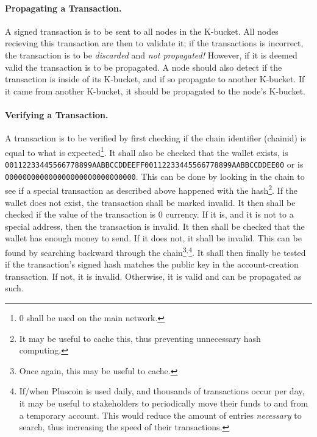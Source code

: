 \documentclass{article}
\begin{document}
\label{prop}
\paragraph{Propagating a Transaction.} A signed transaction is to be sent to all
nodes in the K-bucket. All nodes recieving this transaction are then to validate
it; if the transactions is incorrect, the transaction is to be {\it{discarded}}
and {\it{not propagated!}} However, if it is deemed valid the transaction is to
be propagated. A node should also detect if the transaction is inside of its
K-bucket, and if so propagate to another K-bucket.  If it came from another
K-bucket, it should be propagated to the node's K-bucket.

\paragraph{Verifying a Transaction.} A transaction is to be verified by first
checking if the chain identifier (chainid) is equal to what is
expected\footnote{$0$ shall be used on the main network.}. It shall also be
checked that the wallet exists, is
{\texttt{00112233445566778899AABBCCDDEE\-FF00112233445566778899AABBCCDDEE00}}
or is
{\texttt{000000000000000000000000000000}}.
This can be done by looking in the chain to see if a special transaction
as described above happened with the hash\footnote{It may be useful to cache
this, thus preventing unnecessary hash computing.}. If the wallet does not
exist, the transaction shall be marked invalid. It then shall be checked if the
value of the transaction is 0 currency. If it is, and it is not to
a special address, then the transaction is invalid. It then shall be checked
that the wallet has enough money to send. If it does not, it shall be invalid.
This can be found by searching backward through the chain\footnote{Once
again, this may be useful to cache.}$^,$\footnote{If/when Pluscoin is used
daily, and thousands of transactions occur per day, it may be useful to
stakeholders to periodically move their funds to and from a temporary account.
This would reduce the amount of entries {\it{necessary}} to search, thus
increasing the speed of their transactions.}. It shall then finally be tested
if the transaction's signed hash matches the public key in the account-creation
transaction. If not, it is invalid. Otherwise, it is valid and can be
propagated as such.
\end{document}
